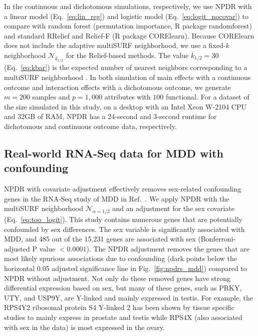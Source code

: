 \documentclass[10pt]{article}
\begin{document}
In the continuous and dichotomous simulations, respectively, we use NPDR with a linear model (Eq.~\ref{eq:lin_reg}) and logistic model (Eq.~\ref{eq:logit_nocovar}) to compare with random forest (permutation importance, R package randomforest) and standard RRelief and Relief-F (R package CORElearn). Because CORElearn does not include the adaptive multiSURF neighborhood, we use a fixed-$k$ neighborhood $\mathcal{N}_{\bar{k}_{1/2}}$ for the Relief-based methods.
The value $\bar{k}_{1/2}=30$ (Eq.~\ref{eq:kbar}) is the expected number of nearest neighbors corresponding to a multiSURF neighborhood \cite{bod}. In both simulation of main effects with a continuous outcome and interaction effects with a dichotomous outcome, we generate $m = 200$ samples and $p = 1,000$ attributes with $100$ functional. For a dataset of the size simulated in this study, on a desktop with an Intel Xeon W-2104 CPU and 32GB of RAM, NPDR has a 24-second and 3-second runtime for dichotomous and continuous outcome data, respectively.

\subsection{Real-world RNA-Seq data for MDD with confounding}
NPDR with covariate adjustment effectively removes sex-related confounding genes in the RNA-Seq study of MDD in Ref.~\cite{mostafavi14}. We apply NPDR with the multiSURF neighborhood $\mathcal{N}_{\alpha=1/2}$ and an adjustment for the sex covariate (Eq.~\ref{eq:too_logit}).
This study contains numerous genes that are potentially confounded by sex differences. The sex variable is significantly associated with MDD, and 485 out of the 15,231 genes are associated with sex (Bonferroni-adjusted P value $<0.0001$). 
The NPDR adjustment removes the genes that are most likely spurious associations due to confounding (dark points below the horizontal 0.05 adjusted significance line in Fig.~\ref{fig:npdrs_mdd}) compared to NPDR without adjustment. 
Not only do these removed genes have strong differential expression based on sex, but many of these genes, such as PRKY, UTY, and USP9Y, are Y-linked and mainly expressed in testis. For example, the RPS4Y2 ribosomal protein S4 Y-linked 2 has been shown by tissue specific studies to mainly express in prostate and testis \cite{lopes2010human} while RPS4X (also associated with sex in the data) is most expressed in the ovary. 
\end{document}
